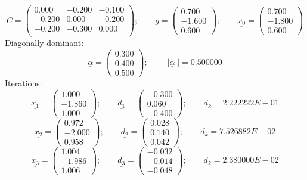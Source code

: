 \documentclass{report}[10pts]
\begin{document}
\[
      \underline{\underline{C}}=
      \begin{pmatrix}
         0.000 & -0.200 & -0.100\\
         -0.200 & 0.000 & -0.200\\
         -0.200 & -0.300 & 0.000\\
      \end{pmatrix}
      ;\qquad
      \underline{g}=
      \begin{pmatrix}
      0.700 \\ -1.600 \\ 0.600
      \end{pmatrix}
      ;\qquad
      \underline{x_0}=
      \begin{pmatrix}
      0.700 \\ -1.800 \\ 0.600
      \end{pmatrix}
\]
Diagonally dominant:
\[
      \underline{\alpha}=
      \begin{pmatrix}
      0.300 \\ 0.400 \\ 0.500
      \end{pmatrix}
      ;\qquad
   ||\underline{\alpha}||=0.500000
\]
Iterations:
\[
      \underline{x_{1}}=
      \begin{pmatrix}
      1.000 \\ -1.860 \\ 1.000
      \end{pmatrix}
   ;\qquad
      \underline{d_{1}}=
      \begin{pmatrix}
      -0.300 \\ 0.060 \\ -0.400
      \end{pmatrix}
   ;\qquad
   d_k=2.222222E-01
\]
\[
      \underline{x_{2}}=
      \begin{pmatrix}
      0.972 \\ -2.000 \\ 0.958
      \end{pmatrix}
   ;\qquad
      \underline{d_{2}}=
      \begin{pmatrix}
      0.028 \\ 0.140 \\ 0.042
      \end{pmatrix}
   ;\qquad
   d_k=7.526882E-02
\]
\[
      \underline{x_{3}}=
      \begin{pmatrix}
      1.004 \\ -1.986 \\ 1.006
      \end{pmatrix}
   ;\qquad
      \underline{d_{3}}=
      \begin{pmatrix}
      -0.032 \\ -0.014 \\ -0.048
      \end{pmatrix}
   ;\qquad
   d_k=2.380000E-02
\]
\end{document}
